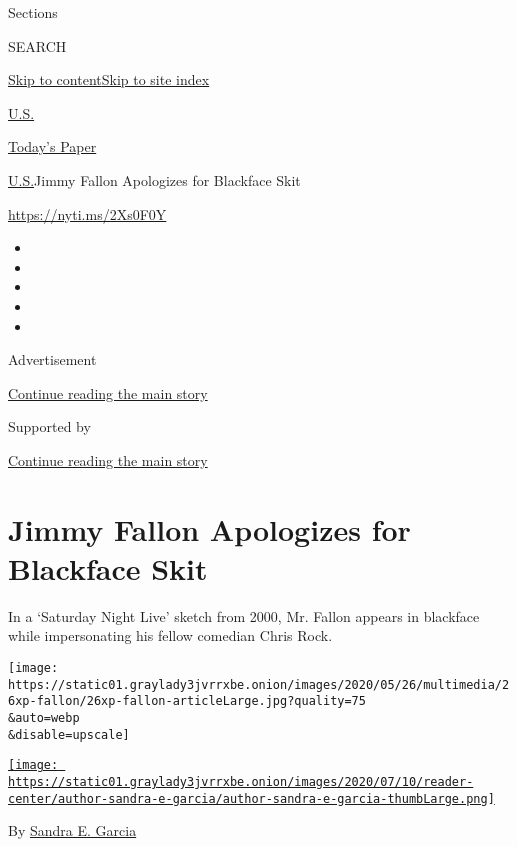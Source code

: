 Sections

SEARCH

\protect\hyperlink{site-content}{Skip to
content}\protect\hyperlink{site-index}{Skip to site index}

\href{https://www.nytimes3xbfgragh.onion/section/us}{U.S.}

\href{https://myaccount.nytimes3xbfgragh.onion/auth/login?response_type=cookie\&client_id=vi}{}

\href{https://www.nytimes3xbfgragh.onion/section/todayspaper}{Today's
Paper}

\href{/section/us}{U.S.}\textbar{}Jimmy Fallon Apologizes for Blackface
Skit

\url{https://nyti.ms/2Xs0F0Y}

\begin{itemize}
\item
\item
\item
\item
\item
\end{itemize}

Advertisement

\protect\hyperlink{after-top}{Continue reading the main story}

Supported by

\protect\hyperlink{after-sponsor}{Continue reading the main story}

\hypertarget{jimmy-fallon-apologizes-for-blackface-skit}{%
\section{Jimmy Fallon Apologizes for Blackface
Skit}\label{jimmy-fallon-apologizes-for-blackface-skit}}

In a `Saturday Night Live' sketch from 2000, Mr. Fallon appears in
blackface while impersonating his fellow comedian Chris Rock.

\texttt{[image: https://static01.graylady3jvrrxbe.onion/images/2020/05/26/multimedia/26xp-fallon/26xp-fallon-articleLarge.jpg?quality=75\\\&auto=webp\\\&disable=upscale]}

\href{https://www.nytimes3xbfgragh.onion/by/sandra-e-garcia}{\texttt{[image: https://static01.graylady3jvrrxbe.onion/images/2020/07/10/reader-center/author-sandra-e-garcia/author-sandra-e-garcia-thumbLarge.png]}}

By \href{https://www.nytimes3xbfgragh.onion/by/sandra-e-garcia}{Sandra
E. Garcia}

